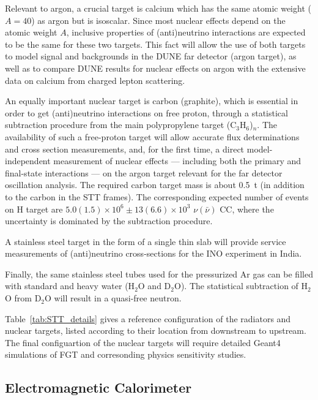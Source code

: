 Relevant to argon, a crucial target is calcium which has the same
atomic weight ($A=40$) as argon but is isoscalar.  Since most nuclear
effects depend on the atomic weight $A$, inclusive properties of
(anti)neutrino interactions are expected to be the same for these two
targets.  This fact will allow the use of both targets to model
signal and backgrounds in the DUNE far detector (argon target), as
well as to compare DUNE results for nuclear effects on argon with the
extensive data on calcium from charged lepton scattering.


An equally important nuclear target is carbon (graphite), which is
essential in order to get (anti)neutrino interactions on free proton,
through a statistical subtraction procedure from the main
polypropylene target (C$_3$H$_6$)$_n$.  The availability of such a
free-proton target will allow accurate flux determinations and cross
section measurements, and, for the first time, a direct
model-independent measurement of nuclear effects --- including both
the primary and final-state interactions --- on the argon target
relevant for the far detector oscillation analysis. The required
carbon target mass is about 0.5~t (in addition to the carbon in the
STT frames). The corresponding expected number of events on H target
are $5.0 (1.5) \times 10^6 \pm 13(6.6) \times 10^3$ $\nu(\bar \nu)$
CC, where the uncertainty is dominated by the subtraction procedure.

A stainless steel target in the form of a single thin slab will
provide service measurements of (anti)neutrino cross-sections for the
INO experiment in India.

Finally, the same stainless steel tubes used for the pressurized Ar gas can
be filled with standard and heavy water (H$_2$O and D$_2$O). The
statistical subtraction of H$_2$O from D$_2$O will result in a
quasi-free neutron.

Table~\ref{tab:STT_details} gives a reference configuration of the
radiators and nuclear targets, listed according to their location from
downstream to upstream.  The final configuartion of the nuclear
targets will require detailed Geant4 simulations of FGT and
corresonding physics sensitivity studies.


\subsection{Electromagnetic Calorimeter}
\label{cdrsec:detectors-nd-ref-fgt-ecal}

